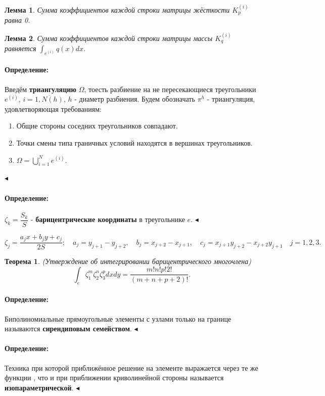 \documentclass{article}
\newtheorem{theorem}{Теорема}
\newtheorem{lemma}{Лемма}
\newenvironment{definition}{ \paragraph{Определение:}}{\hfill $\blacktriangleleft$}
\begin{document}
\begin{lemma}
	Сумма коэффициентов каждой строки матрицы жёсткости $K_p^{(i)}$ равна 0.
\end{lemma}

\begin{lemma}
	Сумма коэффициентов каждой строки матрицы массы $K_q^{(i)}$ равняется $\int_{e^{(i)}}q(x) dx$.
\end{lemma}

\begin{definition}
	Введём \textbf{триангуляцию} $\Omega$, тоесть разбиение на не пересекающиеся треугольники $e^{(i)}$, $i=\overline{1,N(h)}$, $h$ - диаметр разбиения. Будем обозначать $\pi^h$ - триангуляция, удовлетворяющая требованиям:
	\begin{enumerate}
	\item Общие стороны соседних треугольников совпадают.
	\item Точки смены типа граничных условий находятся в вершинах треугольников.
	\item $\Omega = \bigcup_{i = 1}^{N} e^{(i)} $.
	\end{enumerate}
\end{definition}

\begin{definition}
	$\zeta_k = \dfrac{S_k}{S}$ - \textbf{барицентрические координаты} в треугольнике $e$.
\end{definition}

\[
	\zeta_j = \dfrac{a_j x + b_j y + c_j}{2S}; \quad
	a_j = y_{j+1} - y _{j+2}, \quad 
	b_j = x_{j+2} - x_{j+1}, \quad 
	c_j = x_{j+1} y_{j+2} - x_{j+2} y_{j+1} \quad j = 1,2,3.
\]

\begin{theorem}
	(Утверждение об интегрировании барицентрического многочлена)
	\[
	\int_e \zeta_1^m \zeta_2^n \zeta_3^p dx dy = \dfrac{m!n!p!2!}{(m+n+p+2)!}.	
	\]
\end{theorem}

\begin{definition}
	Биполиномиальные прямоугольные элементы с узлами только на границе называются \textbf{сирендиповым семейством}.
\end{definition}

\begin{definition}
	Техника при которой приближённое решение на элементе выражается через те же функции , что и при приближении криволинейной стороны называется \textbf{изопараметрической}.
\end{definition}
\end{document}
